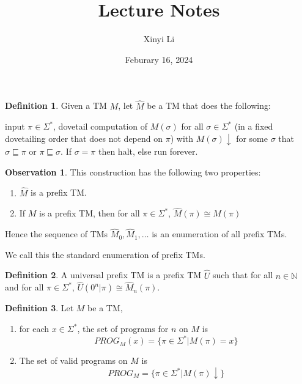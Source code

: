 \documentclass[12pt]{article}
\title{Lecture Notes}
\author{Xinyi Li}
\date{Feburary 16, 2024}
\theoremstyle{definition}
\newtheorem*{definition}{Definition}
\newtheorem*{observation}{Observation}
\begin{document}
\maketitle

\begin{definition}

    Given a TM $M$, let $\hat M$ be a TM that does the following:

    input $\pi \in \Sigma^*$, dovetail computation of $M(\sigma)$ for all $\sigma \in \Sigma^*$ (in a fixed dovetailing order that does not depend on $\pi$) with $M(\sigma) \downarrow$ for some $\sigma$ that $\sigma \sqsubseteq \pi$ or $\pi \sqsubseteq \sigma$. If $\sigma = \pi$ then halt, else run forever.

\end{definition}

\begin{observation}
    This construction has the following two properties:

    \begin{enumerate}
        \item  $\hat M$ is a prefix TM.
        \item If $M$ is a prefix TM, then for all $\pi \in \Sigma^*$, $\hat M(\pi) \cong M(\pi)$
    \end{enumerate}

    Hence the sequence of TMs $\hat M_0, \hat M_1, \ldots$ is an enumeration of all prefix TMs.

    We call this the standard enumeration of prefix TMs.
\end{observation}

\begin{definition}
    A universal prefix TM is a prefix TM $\hat U$ such that for all $n \in \mathbb{N}$ and for all $\pi \in \Sigma^*$, $\hat U(0^n|\pi) \cong \hat M_n(\pi)$.
\end{definition}

\begin{definition}
    Let $M$ be a TM,

    \begin{enumerate}
        \item for each $x \in \Sigma^*$, the set of programs for $n$ on $M$ is $$PROG_M(x) = \{\pi \in \Sigma^* \vert M(\pi) = x\}$$
        \item The set of valid programs on $M$ is $$PROG_M = \{\pi \in \Sigma^* \vert M(\pi) \downarrow\}$$
    \end{enumerate}
\end{definition}
\end{document}
